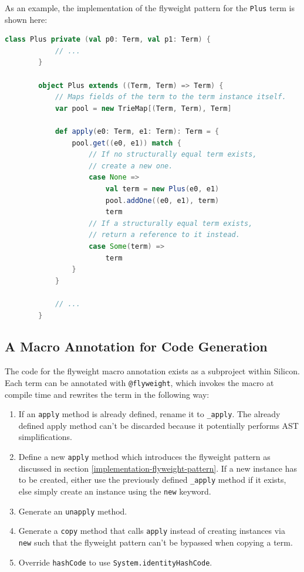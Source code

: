 \documentclass[11pt]{article}
\begin{document}
    As an example, the implementation of the flyweight pattern for the \texttt{Plus} term is shown here:

    \begin{lstlisting}[language=Scala, caption={Implementation of the flyweight pattern.}, label={lst:flyweight-pattern}]
        class Plus private (val p0: Term, val p1: Term) {
            // ...
        }
        
        object Plus extends ((Term, Term) => Term) {
            // Maps fields of the term to the term instance itself.
            var pool = new TrieMap[(Term, Term), Term]
        
            def apply(e0: Term, e1: Term): Term = {
                pool.get((e0, e1)) match {
                    // If no structurally equal term exists,
                    // create a new one.
                    case None => 
                        val term = new Plus(e0, e1)
                        pool.addOne((e0, e1), term)
                        term
                    // If a structurally equal term exists,
                    // return a reference to it instead.
                    case Some(term) => 
                        term
                }
            }

            // ...
        }       
    \end{lstlisting}

    \subsection{A Macro Annotation for Code Generation}

    The code for the flyweight macro annotation exists as a subproject within Silicon. Each term can be
    annotated with \texttt{@flyweight}, which invokes the macro at compile time and 
    rewrites the term in the following way:

    \begin{enumerate}
        \item If an \texttt{apply} method is already defined, rename it to \texttt{\_apply}.
            The already defined apply method can't be discarded because it potentially
            performs AST simplifications.
        \item Define a new \texttt{apply} method which introduces the flyweight pattern
            as discussed in section \ref{implementation-flyweight-pattern}.
            If a new instance has to be created, either use  the previously 
            defined \texttt{\_apply} method
            if it exists, else simply create an instance using the \texttt{new} keyword.
        \item Generate an \texttt{unapply} method.
        \item Generate a \texttt{copy} method that calls \texttt{apply} instead of creating
            instances via \texttt{new} such that the flyweight pattern can't be bypassed
            when copying a term.
        \item Override \texttt{hashCode} to use \texttt{System.identityHashCode}.
    \end{enumerate}
\end{document}
